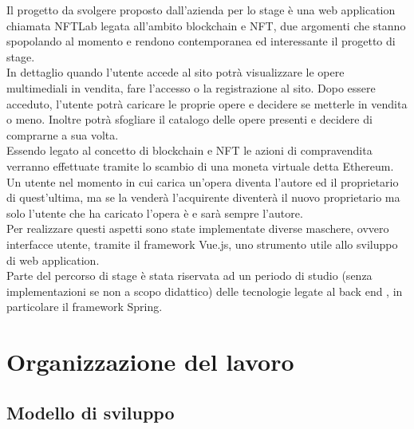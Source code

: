 Il progetto da svolgere proposto dall'azienda per lo stage è una web application chiamata NFTLab legata all'ambito blockchain e NFT, due argomenti che stanno spopolando al momento e rendono contemporanea ed interessante il progetto di stage.\\
In dettaglio quando l'utente accede al sito potrà visualizzare le opere multimediali in vendita, fare l'accesso o la registrazione al sito. Dopo essere acceduto, l'utente potrà caricare le proprie opere e decidere se metterle in vendita o meno. Inoltre potrà sfogliare il catalogo delle opere presenti e decidere di comprarne a sua volta.\\
Essendo legato al concetto di blockchain e NFT le azioni di compravendita verranno effettuate tramite lo scambio di una moneta virtuale detta Ethereum. Un utente nel momento in cui carica un'opera diventa l'autore ed il proprietario di quest'ultima, ma se la venderà l'acquirente diventerà il nuovo proprietario ma solo l'utente che ha caricato l'opera è e sarà sempre l'autore.\\
Per realizzare questi aspetti sono state implementate diverse maschere, ovvero interfacce utente, tramite il framework Vue.js, uno strumento utile allo sviluppo di web application.\\
Parte del percorso di stage è stata riservata ad un periodo di studio (senza implementazioni se non a scopo didattico) delle tecnologie legate al back end , in particolare il framework Spring.

\section{Organizzazione del lavoro}

\subsection{Modello di sviluppo}

